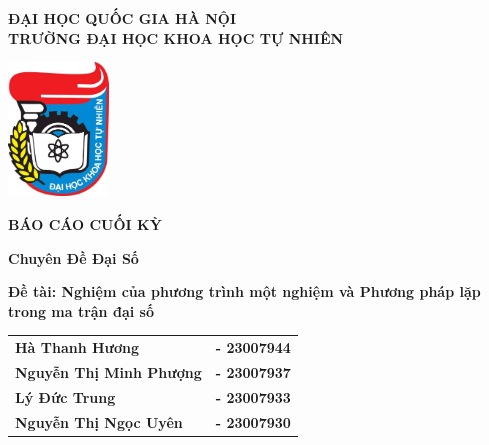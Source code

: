 \thispagestyle{empty}


\begin{center}
  \vspace{0.8cm} %
  \textbf{ĐẠI HỌC QUỐC GIA HÀ NỘI} \\
  \textbf{\fontsize{14pt}{17pt}\selectfont TRƯỜNG ĐẠI HỌC KHOA HỌC TỰ NHIÊN}

  \vspace{1cm}
  \includegraphics[width=0.2\textwidth]{figures/hus_logo.jpg}
  \vspace{1cm}
  
  \textbf{\fontsize{35pt}{33pt}\selectfont BÁO CÁO CUỐI KỲ}

  \vspace{0.5cm}
  \textbf{\fontsize{23pt}{28pt}\selectfont Chuyên Đề Đại Số}

    \vspace{0.5cm}
    \parbox{\dimexpr\textwidth - 0.8cm\relax}{
      \centering
      \textbf{\fontsize{20pt}{28pt}\selectfont 
      Đề tài: Nghiệm của phương trình một nghiệm và Phương pháp lặp trong ma trận đại số}
    }

    \vspace{1.3cm}
    \renewcommand{\arraystretch}{1.2} %
    \begin{tabular}{@{}l l@{}}
      \textbf{\fontsize{14pt}{17pt}Hà Thanh Hương} & \textbf{\fontsize{14pt}{17pt}- 23007944} \\
      \textbf{\fontsize{14pt}{17pt}Nguyễn Thị Minh Phượng} & \textbf{\fontsize{14pt}{17pt}- 23007937} \\
      \textbf{\fontsize{14pt}{17pt}Lý Đức Trung} & \textbf{\fontsize{14pt}{17pt}- 23007933} \\
      \textbf{\fontsize{14pt}{17pt}Nguyễn Thị Ngọc Uyên} & \textbf{\fontsize{14pt}{17pt}- 23007930} \\
    \end{tabular}
    \renewcommand{\arraystretch}{1} %
    

\end{center}
